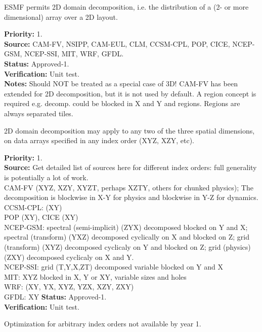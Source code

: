 
ESMF permits 2D domain decomposition, i.e. the distribution of a
(2- or more dimensional) array over a 2D layout.

\begin{reqlist}
{\bf Priority:} 1. \\ 
{\bf Source:} CAM-FV, NSIPP, CAM-EUL, CLM, CCSM-CPL, POP, CICE, NCEP-GSM, NCEP-SSI, MIT, WRF, GFDL. \\
{\bf Status:} Approved-1. \\
{\bf Verification:} Unit test. \\
{\bf Notes:} Should NOT be treated as a special case of 3D!
        CAM-FV has been extended for 2D decomposition, but 
        it is not used by default.
        A region concept is required e.g. decomp. could
        be blocked in X and Y and regions. Regions are always
        separated tiles.
\end{reqlist}


2D domain decomposition may apply to any two of the three spatial
dimensions, on data arrays specified in any index order (XYZ, XZY,
etc).

\begin{reqlist}
{\bf Priority:} 1. \\ 
{\bf Source:} Get detailed list of sources here for different index
  orders: full generality is potentially a lot of work. \\
  CAM-FV  (XYZ, XZY, XYZT, perhaps XZTY, others for chunked physics);
  The decomposition is blockwise in X-Y for physics and blockwise in 
  Y-Z for dynamics.  \\
  CCSM-CPL: (XY) \\
  POP (XY), CICE (XY) \\
  NCEP-GSM: spectral (semi-implicit) (ZYX) decomposed blocked on Y and X; 
            spectral (transform) (YXZ) decomposed cyclically on X and blocked on Z;
            grid (transform) (XYZ) decomposed cyclicaly on Y and blocked on Z; 
            grid (physics) (ZXY) decomposed cyclicaly on X and Y. \\
  NCEP-SSI: grid (T,Y,X,ZT) decomposed variable blocked on Y and X \\
  MIT: XYZ blocked in X, Y or XY, variable sizes and holes \\
  WRF: (XY, YX, XYZ, YZX, XZY, ZXY) \\
  GFDL: XY
{\bf Status:} Approved-1. \\
{\bf Verification:} Unit test.

        Optimization for arbitrary index orders not available by year 1.
\end{reqlist}

